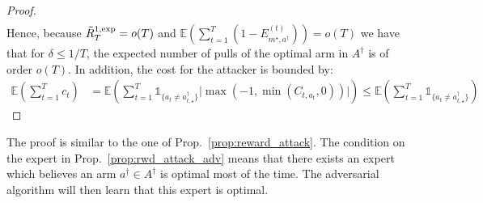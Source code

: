 \begin{proof}
\begin{align*}
\end{align*}
Hence, because $\Tilde{R}_{T}^{1,\text{exp}} = o(T)$ and $\mathbb{E}\left(\sum_{t=1}^{T}(1 - E_{m^{\star}, a^{\dagger}}^{(t)})\right) = o(T)$ we have that for $\delta \leq 1/T$, the expected number of pulls of the optimal arm in $A^{\dagger}$ is of order $o(T)$. In addition, the cost for the attacker is bounded by: 
\begin{align*}
\mathbb{E}\left(\sum_{t=1}^{T} c_{t}\right) &= \mathbb{E}\left(\sum_{t=1}^{T} \mathds{1}_{\{a_{t}\neq a^{\dagger}_{t,\star}\}} \big|\max(-1, \min(C_{t, a_{t}},0))\big| \right)\leq  \mathbb{E}\left( \sum_{t=1}^{T} \mathds{1}_{\{a_{t}\neq a^{\dagger}_{t,\star}\}}\right)
\end{align*}
\end{proof}

The proof is similar to the one of Prop.~\ref{prop:reward_attack}. The condition on the expert in Prop.~\ref{prop:rwd_attack_adv} means that there exists an expert which believes an arm $a^{\dagger}\in A^{\dagger}$ is optimal most of the time. The adversarial algorithm will then learn that this expert is optimal. %
